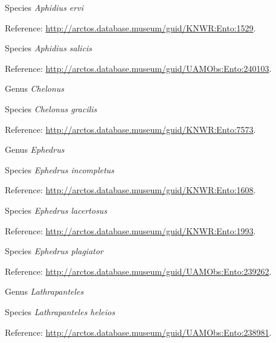 \documentclass[9pt, article]{memoir}
\begin{document}
\begin{multicols}{2}
\vspace{6pt}\noindent\hspace{36pt}Species \textit{Aphidius ervi}


Reference: 
\url{http://arctos.database.museum/guid/KNWR:Ento:1529}.

\vspace{6pt}\noindent\hspace{36pt}Species \textit{Aphidius salicis}


Reference: 
\url{http://arctos.database.museum/guid/UAMObs:Ento:240103}.

\vspace{6pt}\noindent\hspace{30pt}Genus \textit{Chelonus}


\vspace{6pt}\noindent\hspace{36pt}Species \textit{Chelonus gracilis}


Reference: 
\url{http://arctos.database.museum/guid/KNWR:Ento:7573}.

\vspace{6pt}\noindent\hspace{30pt}Genus \textit{Ephedrus}


\vspace{6pt}\noindent\hspace{36pt}Species \textit{Ephedrus incompletus}


Reference: 
\url{http://arctos.database.museum/guid/KNWR:Ento:1608}.

\vspace{6pt}\noindent\hspace{36pt}Species \textit{Ephedrus lacertosus}


Reference: 
\url{http://arctos.database.museum/guid/KNWR:Ento:1993}.

\vspace{6pt}\noindent\hspace{36pt}Species \textit{Ephedrus plagiator}


Reference: 
\url{http://arctos.database.museum/guid/UAMObs:Ento:239262}.

\vspace{6pt}\noindent\hspace{30pt}Genus \textit{Lathrapanteles}


\vspace{6pt}\noindent\hspace{36pt}Species \textit{Lathrapanteles heleios}


Reference: 
\url{http://arctos.database.museum/guid/UAMObs:Ento:238981}.


\end{multicols}
\end{document}
